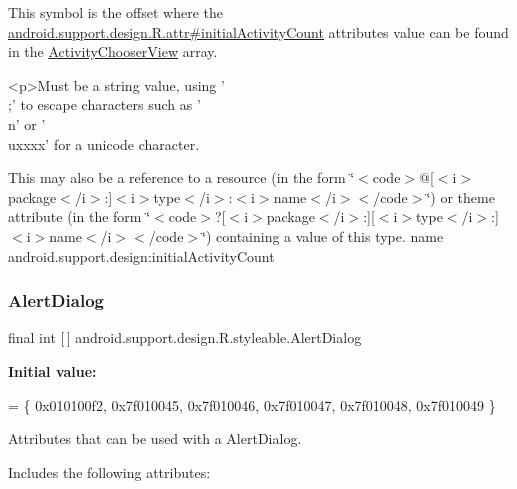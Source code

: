This symbol is the offset where the \hyperlink{classandroid_1_1support_1_1design_1_1R_1_1attr_a169175309f22c90214d396ce178fe3dc}{android.\+support.\+design.\+R.\+attr\#initial\+Activity\+Count} attribute\textquotesingle{}s value can be found in the \hyperlink{classandroid_1_1support_1_1design_1_1R_1_1styleable_a793c8e02386efdda6b3cf815e635b3fe}{Activity\+Chooser\+View} array.

\begin{DoxyVerb}      <p>Must be a string value, using '\\;' to escape characters such as '\\n' or '\\uxxxx' for a unicode character.
\end{DoxyVerb}
 

This may also be a reference to a resource (in the form \char`\"{}$<$code$>$@\mbox{[}$<$i$>$package$<$/i$>$\+:\mbox{]}$<$i$>$type$<$/i$>$\+:$<$i$>$name$<$/i$>$$<$/code$>$\char`\"{}) or theme attribute (in the form \char`\"{}$<$code$>$?\mbox{[}$<$i$>$package$<$/i$>$\+:\mbox{]}\mbox{[}$<$i$>$type$<$/i$>$\+:\mbox{]}$<$i$>$name$<$/i$>$$<$/code$>$\char`\"{}) containing a value of this type.  name android.\+support.\+design\+:initial\+Activity\+Count \mbox{\label{classandroid_1_1support_1_1design_1_1R_1_1styleable_aeccb758d25f6e242e6f3a23f3873ec21}} 
\subsubsection{\texorpdfstring{Alert\+Dialog}{AlertDialog}}
{\footnotesize\ttfamily final int \mbox{[}$\,$\mbox{]} android.\+support.\+design.\+R.\+styleable.\+Alert\+Dialog\hspace{0.3cm}{\ttfamily [static]}}

{\bfseries Initial value\+:}
\begin{DoxyCode}
= \{
            0x010100f2, 0x7f010045, 0x7f010046, 0x7f010047,
            0x7f010048, 0x7f010049
        \}
\end{DoxyCode}
Attributes that can be used with a Alert\+Dialog. 

Includes the following attributes\+:

